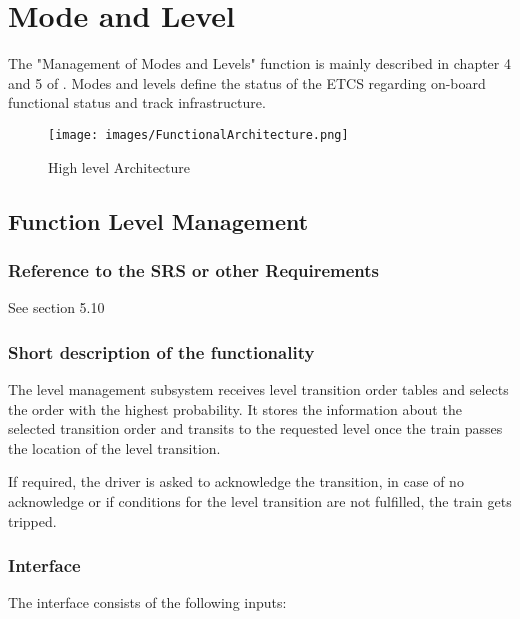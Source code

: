 
\section{Mode and Level}


The "Management of Modes and Levels" function is mainly described in chapter 4 and 5 of \citep{subset-026}. Modes and levels define the status of the ETCS
regarding on-board functional status and track infrastructure.

\begin{figure}
\centering
\texttt{[image: images/FunctionalArchitecture.png]}
\caption{High level Architecture}
\end{figure}

\subsection{Function Level Management}%

\subsubsection{Reference to the SRS or other Requirements}
See \citep{subset-026} section 5.10

\subsubsection{Short description of the functionality}
The level management subsystem receives level transition order tables and selects the order with the highest probability. It stores the information about the selected transition order and transits to the requested level once the train passes the location of the level transition.

If required, the driver is asked to acknowledge the transition, in case of no acknowledge or if conditions for the level transition are not fulfilled, the train gets tripped.

\subsubsection{Interface}
The interface consists of the following inputs:

